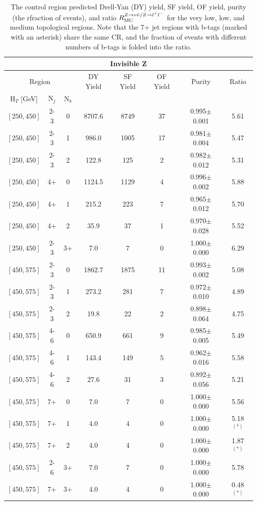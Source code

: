 \begin{table}
	\centering
	\caption{The control region predicted Drell-Yan (DY) yield, SF yield, OF yield, purity (the rfraction of \zll events), and ratio $R_{\mathrm{MC}}^{Z\rightarrow\nu\bar{\nu} / Z\rightarrow l^+ l^-}$ for the very low, low, and medium \HT topological regions. Note that the 7+ jet regions with b-tags (marked with an asterisk) share the same CR, and the fraction of events with different numbers of b-tags is folded into the ratio.}
	\small
	\renewcommand{\arraystretch}{0.5}
	\begin{tabular}{c|c|c|c|c|c|c|c}
\hline \hline
\multicolumn{8}{c}{Invisible Z} \\
\hline
\multicolumn{3}{c|}{Region} & DY Yield & SF Yield & OF Yield & Purity & Ratio\\
$\text{H}_{T}$ [GeV] & $\text{N}_{j}$ & $\text{N}_{b}$ & & & &  \\
\hline
$[250,450]$ &2-3&0&8707.6&8749&37&0.995$\pm$0.001&5.61\\
$[250,450]$ &2-3&1&986.0&1005&17&0.981$\pm$0.004&5.47\\
$[250,450]$ &2-3&2&122.8&125&2&0.982$\pm$0.012&5.31\\
$[250,450]$ &4+&0&1124.5&1129&4&0.996$\pm$0.002&5.88\\
$[250,450]$ &4+&1&215.2&223&7&0.965$\pm$0.012&5.70\\
$[250,450]$ &4+&2&35.9&37&1&0.970$\pm$0.028&5.52\\
$[250,450]$ &2-3&3+&7.0&7&0&1.000$\pm$0.000&6.29\\
$[450,575]$ &2-3&0&1862.7&1875&11&0.993$\pm$0.002&5.08\\
$[450,575]$ &2-3&1&273.2&281&7&0.972$\pm$0.010&4.89\\
$[450,575]$ &2-3&2&19.8&22&2&0.898$\pm$0.064&4.75\\
$[450,575]$ &4-6&0&650.9&661&9&0.985$\pm$0.005&5.49\\
$[450,575]$ &4-6&1&143.4&149&5&0.962$\pm$0.016&5.58\\
$[450,575]$ &4-6&2&27.6&31&3&0.892$\pm$0.056&5.21\\
$[450,575]$ &7+&0&7.0&7&0&1.000$\pm$0.000&5.56\\
$[450,575]$ &7+&1&4.0&4&0&1.000$\pm$0.000&5.18$^{(*)}$\\
$[450,575]$ &7+&2&4.0&4&0&1.000$\pm$0.000&1.87$^{(*)}$\\
$[450,575]$ &2-6&3+&7.0&7&0&1.000$\pm$0.000&5.78\\
$[450,575]$ &7+&3+&4.0&4&0&1.000$\pm$0.000&0.48$^{(*)}$\\

\end{tabular}
\end{table}
